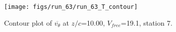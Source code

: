 \begin{figure}[H]
\centering
\texttt{[image: figs/run\_63/run\_63\_T\_contour]}
\caption{Contour plot of $\overline{v_{\theta}}$ at $z/c$=10.00, $V_{free}$=19.1, station 7.}
\label{fig:run_63_T_contour}
\end{figure}


